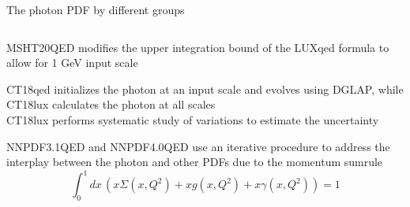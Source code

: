 \documentclass[aspectratio=169, 8pt,t]{beamer}
\begin{document}
\begin{frame}{The photon PDF by different groups}
  \begin{columns}[T]
    \begin{column}{0.59\textwidth}


      \vspace*{1em}
      MSHT20QED modifies the upper integration bound of the LUXqed formula to allow for 1 GeV input scale

      \vspace*{1em}
      CT18qed initializes the photon at an input scale and evolves using DGLAP, while CT18lux calculates the photon at all scales\\

      \vspace*{0.5em}
      CT18lux performs systematic study of variations to estimate the uncertainty

      \vspace*{1em}
      NNPDF3.1QED and NNPDF4.0QED use an iterative procedure to address the interplay between the photon and other PDFs due to the momentum sumrule
      \begin{equation*}
        \int_0^1 dx\, \left(  x\Sigma(x,Q^2) + xg(x,Q^2) + x\gamma(x,Q^2) \right) =1
      \end{equation*}
    \end{column}


\end{columns}
\end{frame}
\end{document}
